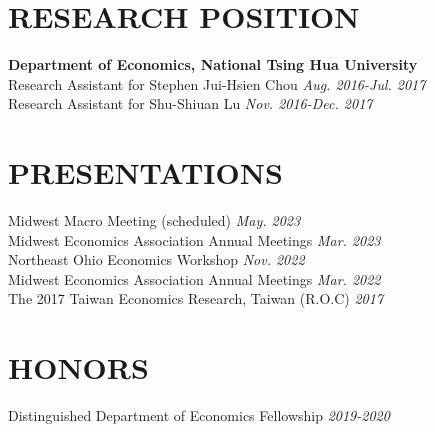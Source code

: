 \documentclass[10pt]{res} %
\begin{document}
\begin{resume}

\section{RESEARCH POSITION}%
\label{sec:research_position}

\vspace{8pt} %

{\bf Department of Economics, National Tsing Hua University} \\
Research Assistant for Stephen Jui-Hsien Chou \hfill  \textit{Aug. 2016-Jul. 2017} \\
Research Assistant for Shu-Shiuan Lu \hfill  \textit{Nov. 2016-Dec. 2017} \\

\vspace{-10pt}

\section{PRESENTATIONS}%
\label{sub:conference_paper}
Midwest Macro Meeting (scheduled) \hfill \textit{May. 2023} \\
Midwest Economics Association Annual Meetings \hfill \textit{Mar. 2023} \\
Northeast Ohio Economics Workshop \hfill \textit{Nov. 2022} \\
Midwest Economics Association Annual Meetings \hfill \textit{Mar. 2022} \\
The 2017 Taiwan Economics Research, Taiwan (R.O.C) \hfill  \textit{2017} \\

\vspace{-10pt}

\section{HONORS}
Distinguished Department of Economics Fellowship \hfill  \textit{2019-2020}\\


\end{resume}
\end{document}
